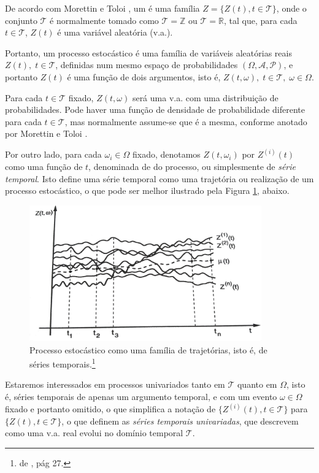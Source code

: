De acordo com Morettin e Toloi \citep{morettin}, um  é uma família $Z = \{ Z(t), t \in \mathcal{T} \}$, onde o conjunto $\mathcal{T}$ é normalmente tomado como $\mathcal{T} = \mathbb{Z}$ ou $\mathcal{T} = \mathbb{R}$, tal que, para cada $t \in \mathcal{T}$, $Z(t)$ é uma variável aleatória (v.a.). 

Portanto, um processo estocástico é uma família de variáveis aleatórias reais $Z(t),\; t \in \mathcal{T}$, definidas num mesmo espaço de probabilidades $(\Omega, \mathcal{A}, \mathcal{P})$, e portanto $Z(t)$ é uma função de dois argumentos, isto é, $Z(t, \omega),\; t \in \mathcal{T},\; \omega \in \Omega$.

Para cada $t \in \mathcal{T}$ fixado, $Z(t, \omega)$ será uma v.a. com uma distribuição de probabilidades. Pode haver uma função de densidade de probabilidade diferente para cada $t \in \mathcal{T}$, mas normalmente assume-se que é a mesma, conforme anotado por Morettin e Toloi \citep{morettin}.

Por outro lado, para cada $\omega_i \in \Omega$ fixado, denotamos $Z(t, \omega_i)$ por $Z^{(i)}(t)$ como uma função de $t$, denominada de  do processo, ou simplesmente de \emph{série temporal}. Isto define uma série temporal como uma trajetória ou realização de um processo estocástico, o que pode ser melhor ilustrado pela Figura \ref{fig:trajetorias}, abaixo.

\begin{figure}[htb]
\centering
\includegraphics[width=10cm]{figuras/trajetorias}
\caption{Processo estocástico como uma família de trajetórias, isto é, de séries temporais.\footnote{  de \citep{morettin}, pág 27.}}
\label{fig:trajetorias}
\end{figure}

Estaremos interessados em processos univariados tanto em $\mathcal{T}$ quanto em $\Omega$, isto é, séries temporais de apenas um argumento temporal, e com um evento $\omega \in \Omega$ fixado e portanto omitido, o que simplifica a notação de $\{Z^{(i)}(t), t \in \mathcal{T}\}$ para $\{Z(t), t \in \mathcal{T}\}$, o que definem as \emph{séries temporais univariadas}, que descrevem como uma v.a. real evolui no domínio temporal $\mathcal{T}$.

